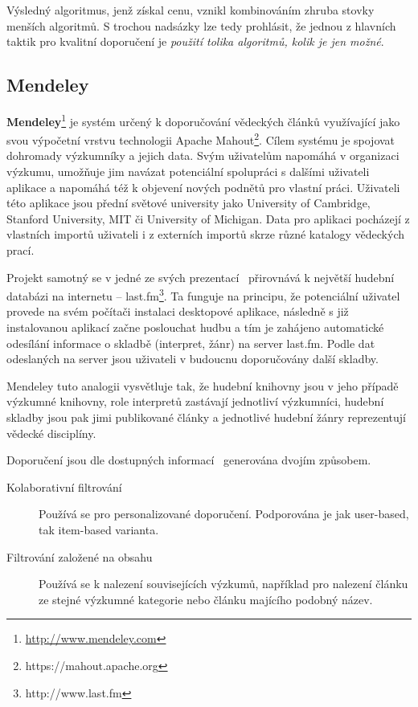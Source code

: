 \documentclass[thesis=M,czech]{FITthesis}[2014/05/07]
\begin{document}
Výsledný algoritmus, jenž získal cenu, vznikl kombinováním zhruba stovky menších algoritmů. S trochou nadsázky lze tedy prohlásit, že jednou z hlavních taktik pro kvalitní doporučení je \emph{použití tolika algoritmů, kolik je jen možné}.

\subsection{Mendeley}	
\label{mendeley}
\textbf{Mendeley}\footnote{\url{http://www.mendeley.com}} je systém určený k doporučování vědeckých článků využívající jako svou výpočetní vrstvu technologii Apache Mahout\footnote{https://mahout.apache.org}. Cílem systému je spojovat dohromady výzkumníky a jejich data. Svým uživatelům napomáhá v organizaci výzkumu, umožňuje jim navázat potenciální spolupráci s dalšími uživateli aplikace a napomáhá též k objevení nových podnětů pro vlastní práci. Uživateli této aplikace jsou přední světové university jako University of Cambridge, Stanford University, MIT či University of Michigan. Data pro aplikaci pocházejí z vlastních importů uživateli i z externích importů skrze různé katalogy vědeckých prací. 

Projekt samotný se v jedné ze svých prezentací~\cite{mendeleylastfm} přirovnává k největší hudební databázi na internetu – last.fm\footnote{http://www.last.fm}. Ta funguje na principu, že potenciální uživatel provede na svém počítači instalaci desktopové aplikace, následně s již instalovanou aplikací začne poslouchat hudbu a tím je zahájeno automatické odesílání informace o skladbě (interpret, žánr) na server last.fm. Podle dat odeslaných na server jsou uživateli v budoucnu doporučovány další skladby. 

Mendeley tuto analogii vysvětluje tak, že hudební knihovny jsou v jeho případě výzkumné knihovny, role interpretů zastávají jednotliví výzkumníci, hudební skladby jsou pak jimi publikované články a jednotlivé hudební žánry reprezentují vědecké disciplíny.  

Doporučení jsou dle dostupných informací~\cite{mendeleylastfm} generována dvojím způsobem. 

\begin{description}
	\item[Kolaborativní filtrování] Používá se pro personalizované doporučení. Podporována je jak user-based, tak item-based varianta.
	\item[Filtrování založené na obsahu] Používá se k nalezení souvisejících výzkumů, například pro nalezení článku ze stejné výzkumné kategorie nebo článku majícího podobný název. 
\end{description}
\end{document}
